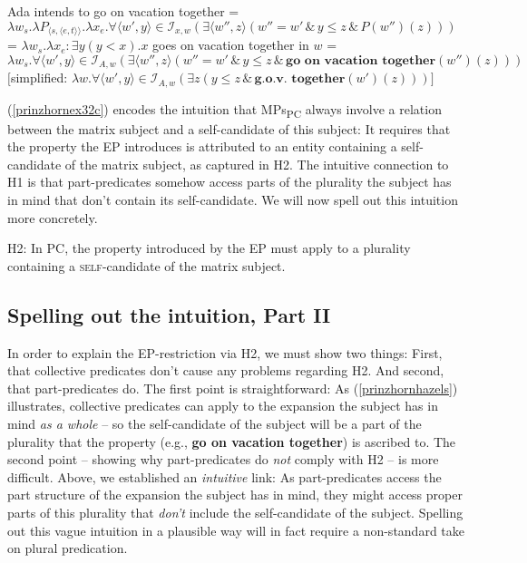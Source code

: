 \documentclass[output=paper,colorlinks,citecolor=brown,
]{langscibook}
\begin{document}
\ea 	\label{prinzhornhazels}
\ea Ada intends to go on vacation together \label{prinzhornex32a}
\ex   {} = $\lambda w_{s}. \lambda P_{\langle s,\langle e,t \rangle \rangle}. \lambda x_{e}. \forall \langle w' ,y \rangle \in \mathcal{I}_{x,w} (\exists \langle w'', z \rangle (w'' = w' \, \& \, y \le z\, \& \,P(w'')(z)))$ \label{prinzhornex32b}
\ex {} = $\lambda w_{s}. \lambda x_{e}: \exists y (y < x). x$ goes on vacation together in $w$\label{prinzhornex32c}
\ex   \sem{}{(\ref{prinzhornex32a})} = $\lambda w_{s}. \forall \langle w' ,y \rangle \in \mathcal{I}_{A,w} (\exists \langle w'', z \rangle (w'' = w' \, \& \, y \le z\, \& \,\textbf{go on vacation together} (w'')(z)))$ \\
$[$simplified: $\lambda w. \forall \langle w' ,y \rangle \in \mathcal{I}_{A,w} (\exists z (y \le z\, \& \,\textbf{g.o.v. together} (w')(z)))]$ \label{prinzhornex32d}
\z\z

(\ref{prinzhornex32c}) encodes the intuition that MPs\textsubscript{PC} always involve a relation between the matrix subject and a self-candidate of this subject: It requires that  the property  the EP introduces is attributed to an entity containing a self-candidate of the matrix subject, as captured in H2. The intuitive connection to H1 is that part-predicates somehow access parts of the plurality the subject has in mind that don't contain its self-candidate. We will now spell out this intuition more concretely.


\ea H2: In PC, the property introduced by the EP must apply to a plurality containing a \textsc{self}-candidate of the matrix subject. \label{prinzhornexr2} \z


\subsection{Spelling out the intuition, Part II}\label{prinzhornsec:4.2}

In order to explain the EP-restriction via H2, we must show two things: First,  that collective predicates don't cause any problems regarding H2. And second, that part-predicates do. The first point is straightforward: As (\ref{prinzhornhazels}) illustrates, collective predicates can apply to the expansion the subject has in mind \textit{as a whole} -- so  the self-candidate of the subject will  be a part of the plurality that the property (e.g., \textbf{go on vacation together})  is ascribed to. The second point -- showing why part-predicates do \textit{not}  comply with H2 -- is more difficult. Above, we established an \textit{intuitive} link: As part-predicates access the part structure of the expansion the subject has in mind, they might access proper parts of this plurality that \textit{don't} include the self-candidate of the subject. Spelling out this vague intuition in a plausible way will in fact require a non-standard take on plural predication.
\end{document}
